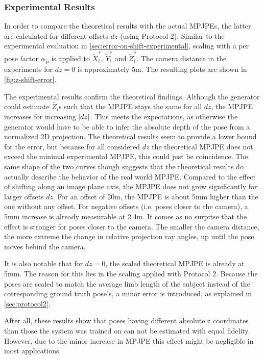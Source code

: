 \subsubsection{Experimental Results}
\label{sec:error-on-shift-experimental}



In order to compare the theoretical results with the actual MPJPEs, the latter are calculated for different offsets $dz$ (using Protocol 2).
Similar to the experimental evaluation in \autoref{sec:error-on-shift-experimental}, scaling with a per pose factor $\alpha_{\widetilde{P}}$ is applied to $\widetilde{X}_i^\ast$, $\widetilde{Y}_i^\ast$ and $\widetilde{Z}_i^\ast$.
The camera distance in the experiments for $dz = 0$ is approximately 5m.
The resulting plots are shown in \autoref{fig:z-shift-error}.

The experimental results confirm the theoretical findings.
Although the generator could estimate $\widetilde{Z_i}$s such that the MPJPE stays the same for all $dz$, the MPJPE increases for increasing $\abs{dz}$.
This meets the expectations, as otherwise the generator would have to be able to infer the absolute depth of the pose from a normalized 2D projection.
The theoretical results seem to provide a lower bound for the error, but because for all considered $dz$ the theoretical MPJPE does not exceed the minimal experimental MPJPE, this could just be coincidence.
The same shape of the two curves though suggests that the theoretical results do actually describe the behavior of the real world MPJPE.
Compared to the effect of shifting along an image plane axis, the MPJPE does not grow significantly for larger offsets $dz$.
For an offset of 20m, the MPJPE is about 5mm higher than the one without any offset.
For negative offsets (i.e. poses closer to the camera), a 5mm increase is already measurable at 2.4m.
It comes as no surprise that the effect is stronger for poses closer to the camera.
The smaller the camera distance, the more extreme the change in relative projection ray angles, up until the pose moves behind the camera.

It is also notable that for $dz = 0$, the scaled theoretical MPJPE is already at 5mm.
The reason for this lies in the scaling applied with Protocol 2.
Because the poses are scaled to match the average limb length of the subject instead of the corresponding ground truth pose's, a minor error is introduced, as explained in \autoref{sec:protocol2}.

After all, these results show that poses having different absolute z coordinates than those the system was trained on can not be estimated with equal fidelity.
However, due to the minor increase in MPJPE this effect might be negligible in most applications.


